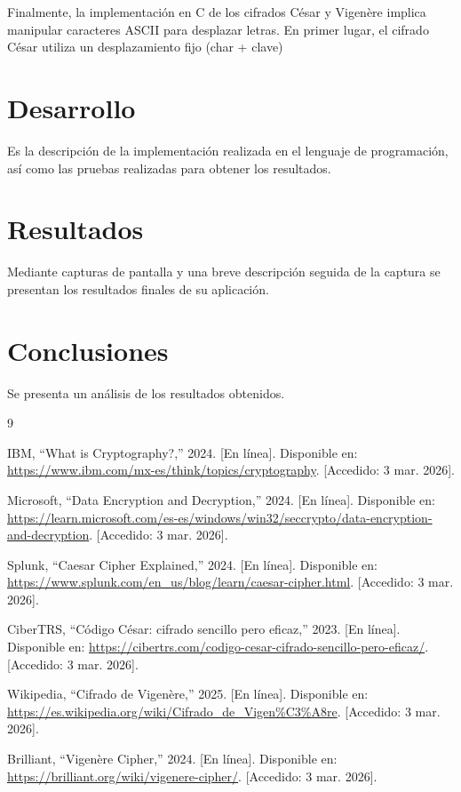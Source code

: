 \documentclass[letterpaper,12pt,oneside]{article}
\begin{document}
Finalmente, la implementación en C de los cifrados César y Vigenère implica manipular caracteres ASCII para desplazar letras. En primer lugar, el cifrado César utiliza un desplazamiento fijo (char + clave) %

\section{Desarrollo}

Es la descripción de la implementación realizada en el lenguaje de programación, así como las pruebas realizadas para obtener los resultados.

\section{Resultados}

Mediante capturas de pantalla y una breve descripción seguida de la captura se presentan los resultados finales de su aplicación.

\section{Conclusiones}

Se presenta un análisis de los resultados obtenidos.

\begin{thebibliography}{9}

IBM, ``What is Cryptography?,'' 2024. [En línea]. Disponible en: \url{https://www.ibm.com/mx-es/think/topics/cryptography}. [Accedido: 3 mar. 2026].

Microsoft, ``Data Encryption and Decryption,'' 2024. [En línea]. Disponible en: \url{https://learn.microsoft.com/es-es/windows/win32/seccrypto/data-encryption-and-decryption}. [Accedido: 3 mar. 2026].

Splunk, ``Caesar Cipher Explained,'' 2024. [En línea]. Disponible en: \url{https://www.splunk.com/en_us/blog/learn/caesar-cipher.html}. [Accedido: 3 mar. 2026].

CiberTRS, ``Código César: cifrado sencillo pero eficaz,'' 2023. [En línea]. Disponible en: \url{https://cibertrs.com/codigo-cesar-cifrado-sencillo-pero-eficaz/}. [Accedido: 3 mar. 2026].

Wikipedia, ``Cifrado de Vigenère,'' 2025. [En línea]. Disponible en: \url{https://es.wikipedia.org/wiki/Cifrado_de_Vigen%C3%A8re}. [Accedido: 3 mar. 2026].

Brilliant, ``Vigenère Cipher,'' 2024. [En línea]. Disponible en: \url{https://brilliant.org/wiki/vigenere-cipher/}. [Accedido: 3 mar. 2026].

\end{thebibliography}
\end{document}
